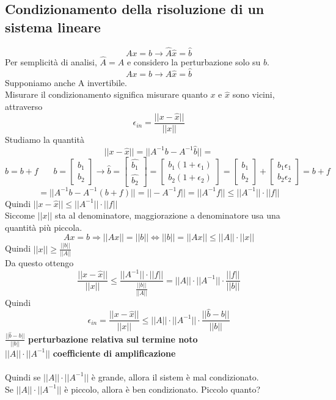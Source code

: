 \documentclass[10pt]{book}
\begin{document}
\subsection{Condizionamento della risoluzione di un sistema lineare}
$$Ax = b \longrightarrow \widehat{A}\widehat{x} = \widehat{b}$$
Per semplicità di analisi, $\widehat{A} = A$ e considero la perturbazione solo su $b$.
$$Ax = b \longrightarrow A\widehat{x} = \widehat{b}$$
Supponiamo anche A invertibile.\\
Misurare il condizionamento significa misurare quanto $x$ e $\widehat{x}$ sono vicini, attraverso $$\epsilon_{in} = \frac{||x - \widehat{x}||}{||x||}$$
Studiamo la quantità $$||x - \widehat{x}|| = ||A^{-1}b - A^{-1}\widehat{b}|| =$$
$$\widehat{b} = b + f\:\:\:\:\:\:\:\:b = \left[\begin{array}{c} b_1\\b_2 \end{array}\right] \rightarrow \widehat{b} = \left[\begin{array}{c} \widehat{b_1}\\\widehat{b_2} \end{array}\right] = \left[\begin{array}{c} b_1(1 + \epsilon_1)\\b_2(1 + \epsilon_2) \end{array}\right] = \left[\begin{array}{c} b_1\\b_2 \end{array}\right] + \left[\begin{array}{c} b_1\epsilon_1\\b_2\epsilon_2 \end{array}\right] = b + f$$
$$= ||A^{-1}b - A^{-1}(b + f)|| = ||-A^{-1}f|| = ||A^{-1}f|| \leq ||A^{-1}||\cdot||f||$$
Quindi $||x - \widehat{x}|| \leq ||A^{-1}||\cdot||f||$\\
Siccome $||x||$ sta al denominatore, maggiorazione a denominatore usa una quantità più piccola.
$$Ax = b \Rightarrow ||Ax|| = ||b|| \Leftrightarrow ||b|| = ||Ax|| \leq ||A||\cdot||x|| $$
Quindi $||x|| \geq \frac{||b||}{||A||}$\\
Da questo ottengo $$\frac{||x - \widehat{x}||}{||x||} \leq \frac{||A^{-1}||\cdot||f||}{\frac{||b||}{||A||}} = ||A||\cdot||A^{-1}||\cdot\frac{||f||}{||b||}$$
Quindi $$\epsilon_{in} = \frac{||x - \widehat{x}||}{||x||} \leq ||A||\cdot||A^{-1}||\cdot\frac{||\widehat{b} - b||}{||b||}$$
$\frac{||\widehat{b} - b||}{||b||}$ \textbf{perturbazione relativa sul termine noto}\\
$||A||\cdot||A^{-1}||$ \textbf{coefficiente di amplificazione}\\\\
Quindi se $||A||\cdot||A^{-1}||$ è grande, allora il sistem è mal condizionato.\\
Se $||A||\cdot||A^{-1}||$ è piccolo, allora è ben condizionato. Piccolo quanto?
\end{document}
